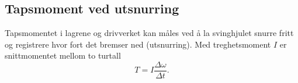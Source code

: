\subsection{Tapsmoment ved utsnurring}
\label{sec:teori-utsnurring}
Tapsmomentet i lagrene og drivverket kan måles ved å la svinghjulet snurre fritt og registrere hvor fort det bremser ned (utsnurring). Med treghetsmoment $I$ er snittmomentet mellom to turtall
\begin{equation}
    T = I \frac{\Delta \omega}{\Delta t} .
    \label{eq:snittmoment}
\end{equation}

